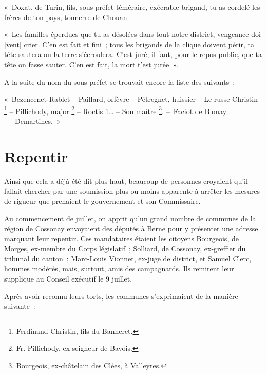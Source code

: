 \documentclass[french,twoside]{book} %
\newenvironment{quoteblock}%
  {\begin{quoting}}
  {\end{quoting}}
\newenvironment{quotebar}{%
    \def\FrameCommand{{\color{rubric!10!}\vrule width 0.5em} \hspace{0.9em}}%
    \def\OuterFrameSep{\itemsep} %
    \MakeFramed {\advance\hsize-\width \FrameRestore}
  }%
  {%
    \endMakeFramed
  }
\renewenvironment{quoteblock}%
  {%
    \savenotes
    \setstretch{0.9}
    \normalfont
    \begin{quotebar}
  }
  {%
    \end{quotebar}
    \spewnotes
  }
\begin{document}
\begin{quoteblock}
 \noindent « Doxat, de Turin, fils, sous-préfet téméraire, exécrable brigand, tu as cordelé les frères de ton pays, tonnerre de Chouan.\par
 « Les familles éperdues que tu as désolées dans tout notre district, vengeance doi [vent] crier. C’en est fait et fini ; tous les brigands de la clique doivent périr, ta tête sautera ou la terre s’écroulera. C’est juré, il faut, pour le repos public, que ta tête on fasse sauter. C’en est fait, la mort t’est jurée ».\par
 A la suite du nom du sous-préfet se trouvait encore la liste des suivants :\par
 « Bezencenet-Rablet – Paillard, orfèvre – Pétregnet, huissier – Le russe Christin \footnote{Ferdinand Christin, fils du Banneret.} – Pillichody, major \footnote{Fr. Pillichody, ex-seigneur de Bavois.} – Roctis 1… – Son maître \footnote{Bourgeois, ex-châtelain des Clées, à Valleyres.}. – Faciot de Blonay — Demartines. »
 \end{quoteblock}

\section[Repentir]{Repentir}
\noindent Ainsi que cela a déjà été dit plus haut, beaucoup de personnes croyaient qu’il fallait chercher par une soumission plus ou moins apparente à arrêter les mesures de rigueur que prenaient le gouvernement et son Commissaire.\par
Au commencement de juillet, on apprit qu’un grand nombre de communes de la région de Cossonay envoyaient des députés à Berne pour y présenter une adresse marquant leur repentir. Ces mandataires étaient les citoyens Bourgeois, de Morges, ex-membre du Corps législatif ; Solliard, de Cossonay, ex-greffier du tribunal du canton ; Marc-Louis Vionnet, ex-juge de district, et Samuel Clerc, hommes modérés, mais, surtout, amis des campagnards. Ils remirent leur supplique au Conseil exécutif le 9 juillet.\par
Après avoir reconnu leurs torts, les communes s’exprimaient de la manière suivante :\par
\end{document}
